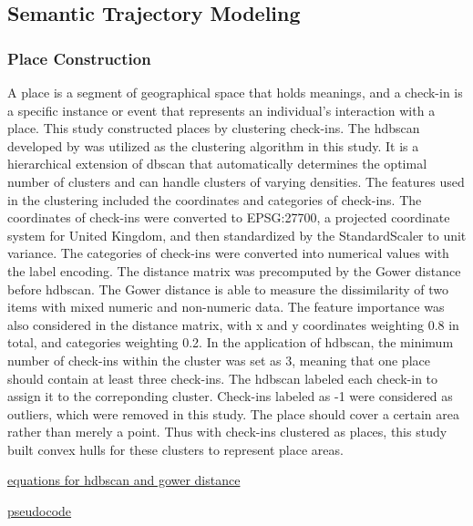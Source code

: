 \documentclass{article}
\begin{document}
\subsection{Semantic Trajectory Modeling} \label{semantic_trajectory_modeling}

\subsubsection{Place Construction}
A place is a segment of geographical space that holds meanings, and a check-in is a specific instance or event that represents an individual's interaction with a place. This study constructed places by clustering check-ins. The \acrfull{hdbscan} developed by \cite{campello_density-based_2013} was utilized as the clustering algorithm in this study. It is a hierarchical extension of \acrshort{dbscan} that automatically determines the optimal number of clusters and can handle clusters of varying densities. The features used in the clustering included the coordinates and categories of check-ins. The coordinates of check-ins were converted to EPSG:27700, a projected coordinate system for United Kingdom, and then standardized by the StandardScaler to unit variance. The categories of check-ins were converted into numerical values with the label encoding. The distance matrix was precomputed by the Gower distance before \acrshort{hdbscan}. The Gower distance is able to  measure the dissimilarity of two items with mixed numeric and non-numeric data. The feature importance was also considered in the distance matrix, with x and y coordinates weighting 0.8 in total, and categories weighting 0.2. In the application of \acrshort{hdbscan}, the minimum number of check-ins within the cluster was set as 3, meaning that one place should contain at least three check-ins. The \acrshort{hdbscan} labeled each check-in to assign it to the correponding cluster. Check-ins labeled as -1 were considered as outliers, which were removed in this study. The place should cover a certain area rather than merely a point. Thus with check-ins clustered as places, this study built convex hulls for these clusters to represent place areas.

\underline{equations for hdbscan and gower distance}



\underline{pseudocode}
\end{document}
